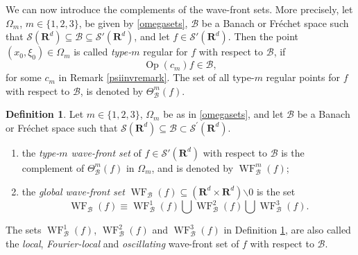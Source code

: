\documentclass[12pt,a4paper,reqno]{amsart}
\numberwithin{equation}{section}
\numberwithin{thm}{section}
\theoremstyle{definition}
\newtheorem{defn}[thm]{Definition}
\theoremstyle{remark}
\begin{document}
\par

We can now introduce the complements of the wave-front sets.
More precisely, let $\Omega _m$, $m\in \{ 1,2,3\}$, be given by
\eqref{omegasets}, ${{\mathcal B}}$ be a Banach or Fr{\'e}chet space such
that $\mathscr S({\mathbf R^{d}})\subseteq {{\mathcal B}} \subseteq \mathscr S'({\mathbf R^{d}})$,
and let $f\in \mathscr S'({\mathbf R^{d}})$. Then the point $(x_0,\xi _0)\in
\Omega _m$ is called \emph{type-$m$} regular for $f$ with
respect to ${{\mathcal B}}$, if
\begin{equation}\label{ImageOpcm}
{\operatorname{Op}} (c_m)f\in {{\mathcal B}} ,
\end{equation}
for some $c_m$ in Remark \ref{psiinvremark}. The set of all type-$m$
regular points for $f$ with respect to ${{\mathcal B}}$, is denoted by
$\Theta ^m_{{\mathcal B}}(f)$.

\par

\begin{defn}\label{def:wfsMB}
Let $m\in \{ 1,2,3\}$, $\Omega _m$ be as in \eqref{omegasets}, and
let ${{\mathcal B}}$ be a Banach or Fr\'echet space such that
$\mathscr S({\mathbf R^{d}})\subseteq {{\mathcal B}} \subset \mathscr S^\prime({\mathbf R^{d}})$.
\begin{enumerate}
\item the \emph{type-$m$ wave-front set} of $f\in \mathscr S'({\mathbf R^{d}})$ with
respect to ${{\mathcal B}}$ is the complement of $\Theta ^m_{{\mathcal B}}(f)$ in $\Omega
_m$, and is denoted by ${\operatorname{WF}} ^m_{{\mathcal B}}(f)$;

{\vspace{0.1cm}}

\item the \emph{global wave-front set} ${\operatorname{WF}_{{\mathcal B}}}(f)\subseteq ({\mathbf R^{d}}\times {\mathbf R^{d}}){\backslash {0}}$ is the set
\begin{equation*}
{\operatorname{WF}_{{\mathcal B}}}(f) \equiv {\operatorname{WF}} ^1_{{\mathcal B}} (f) \bigcup {\operatorname{WF}} ^2_{{\mathcal B}} (f) \bigcup {\operatorname{WF}} ^3_{{\mathcal B}} (f).
\end{equation*}
\end{enumerate}
\end{defn}

\par

The sets ${\operatorname{WF}} ^1_{{\mathcal B}}(f)$, ${\operatorname{WF}} ^2_{{\mathcal B}}(f)$ and ${\operatorname{WF}} ^3_{{\mathcal B}}(f)$
in Definition \ref{def:wfsMB}, are also called the \emph{local},
\emph{Fourier-local} and \emph{oscillating} wave-front set of $f$ with
respect to ${{\mathcal B}}$.
\end{document}
